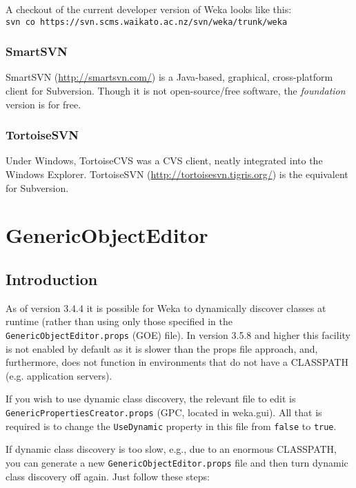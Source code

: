 \noindent A checkout of the current developer version of Weka looks like this:\\

\verb=svn co https://svn.scms.waikato.ac.nz/svn/weka/trunk/weka=\\

\subsubsection*{SmartSVN}
SmartSVN (\url{http://smartsvn.com/}{}) is a Java-based, graphical,
cross-platform client for Subversion. Though it is not
open-source/free software, the \textit{foundation} version is for free.

\subsubsection*{TortoiseSVN}
Under Windows, TortoiseCVS was a CVS client, neatly integrated into
the Windows Explorer. TortoiseSVN
(\url{http://tortoisesvn.tigris.org/}{}) is the equivalent for
Subversion.


\section{GenericObjectEditor}

\subsection{Introduction}
As of version 3.4.4 it is possible for Weka to dynamically discover
classes at runtime (rather than using only those specified in the
\verb=GenericObjectEditor.props= (GOE) file). In version 3.5.8 and higher
this facility is not enabled by default as it is slower than the props file
approach, and, furthermore, does not function in environments that do
not have a CLASSPATH (e.g. application servers).

If you wish to use dynamic class discovery, the relevant file to edit
is\\ \verb=GenericPropertiesCreator.props= (GPC, located in
weka.gui). All that is required is to change the \verb=UseDynamic=
property in this file from \verb=false= to \verb=true=.

If dynamic class discovery is too slow, e.g., due to an enormous CLASSPATH, you can
generate a new \verb=GenericObjectEditor.props= file and then turn dynamic
class discovery off again. Just follow these steps:

